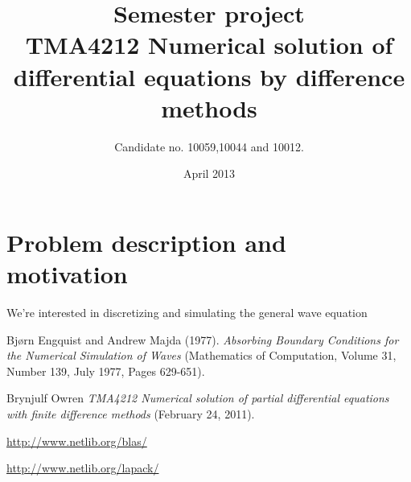 \documentclass{article}
\title{Semester project \\ TMA4212 Numerical solution of differential equations by difference methods }
\author{Candidate no. 10059,10044 and 10012.}
\date{April 2013}
\begin{document}
\maketitle

\section{Problem description and motivation}
We're interested in discretizing and simulating the general wave equation

\begin{thebibliography}{9}

  Bjørn Engquist and Andrew Majda (1977).
  \emph{Absorbing Boundary Conditions for the Numerical Simulation of Waves}
  (Mathematics of Computation, Volume 31, Number 139,
  July 1977, Pages 629-651).

  Brynjulf Owren
  \emph{TMA4212 Numerical solution of partial differential equations with finite difference methods}
  (February 24, 2011).

  \url{http://www.netlib.org/blas/}

  \url{http://www.netlib.org/lapack/}

\end{thebibliography}
\end{document}
